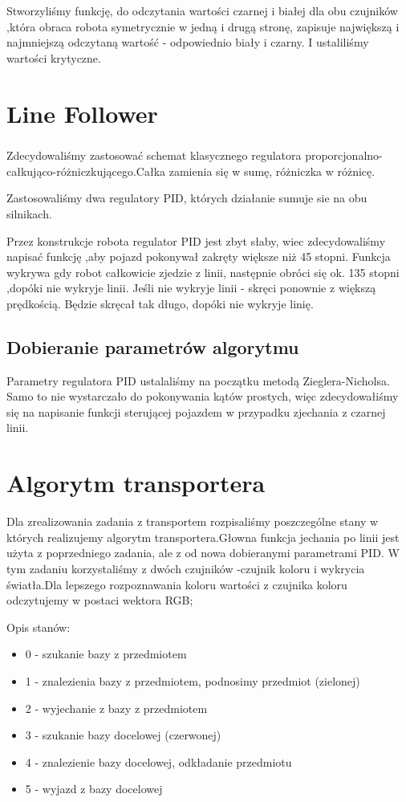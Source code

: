 \documentclass[12pt,a4paper]{report}
\begin{document}
    	Stworzyliśmy funkcję, do odczytania wartości czarnej i białej  dla obu czujników ,która obraca robota symetrycznie w jedną i drugą stronę, zapisuje największą i najmniejszą odczytaną wartość - odpowiednio biały i czarny. I ustaliliśmy wartości krytyczne.

    \section{Line Follower}
    \subparagraph{}
    Zdecydowaliśmy zastosować schemat klasycznego regulatora proporcjonalno-całkująco-różniczkującego.Całka zamienia się w sumę, różniczka w różnicę.
    
    Zastosowaliśmy dwa regulatory PID, których działanie sumuje sie na obu silnikach.
    
    Przez konstrukcje robota regulator PID jest zbyt słaby, wiec zdecydowaliśmy napisać funkcję ,aby pojazd pokonywał zakręty większe niż 45 stopni. Funkcja wykrywa gdy robot całkowicie zjedzie z linii, następnie obróci się ok. 135 stopni ,dopóki nie wykryje linii. Jeśli nie wykryje linii - skręci ponownie z większą prędkością. Będzie skręcał tak długo, dopóki nie wykryje linię.
    \subsection{Dobieranie parametrów algorytmu}
    Parametry regulatora PID ustalaliśmy na początku metodą Zieglera-Nicholsa. Samo to nie wystarczało do pokonywania kątów prostych, więc zdecydowałiśmy się na napisanie funkcji sterującej pojazdem w przypadku zjechania z czarnej linii.
	\section{Algorytm transportera}   
	Dla zrealizowania zadania z transportem rozpisaliśmy poszczególne stany w których realizujemy algorytm transportera.Głowna funkcja jechania po linii jest użyta z poprzedniego zadania, ale z od nowa dobieranymi parametrami PID. W tym zadaniu korzystaliśmy z dwóch czujników -czujnik koloru i wykrycia światła.Dla lepszego rozpoznawania koloru wartości z czujnika koloru odczytujemy w postaci wektora RGB;
	
	Opis stanów:
		\begin{itemize}
		\item 0 - szukanie bazy z przedmiotem
		\item 1 - znalezienia bazy z przedmiotem, podnosimy przedmiot (zielonej)
		\item 2 - wyjechanie z bazy z przedmiotem 
		\item 3 - szukanie bazy docelowej (czerwonej)
		\item 4 - znalezienie bazy docelowej, odkładanie przedmiotu
		\item 5 - wyjazd z bazy docelowej
    		\end{itemize}
    		
\end{document}

